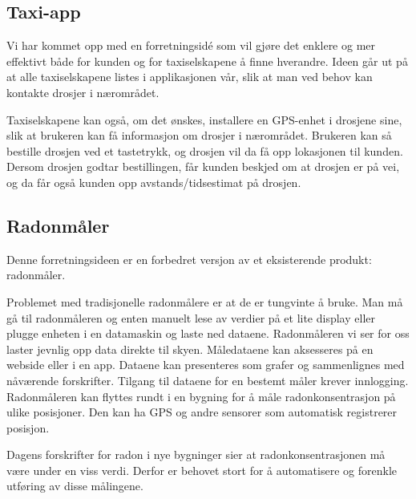 \subsection{Taxi-app}

Vi har kommet opp med en forretningsidé som vil gjøre det enklere og mer effektivt både for kunden og for taxiselskapene å finne hverandre. Ideen går ut på at alle taxiselskapene listes i applikasjonen vår, slik at man ved behov kan kontakte drosjer i nærområdet.

Taxiselskapene kan også, om det ønskes, installere en GPS-enhet i drosjene sine, slik at brukeren kan få informasjon om drosjer i nærområdet. Brukeren kan så bestille drosjen ved et tastetrykk, og drosjen vil da få opp lokasjonen til kunden. Dersom drosjen godtar bestillingen, får kunden beskjed om at drosjen er på vei, og da får også kunden opp avstands/tidsestimat på drosjen.

\subsection{Radonmåler}

Denne forretningsideen er en forbedret versjon av et eksisterende produkt: radonmåler.

Problemet med tradisjonelle radonmålere er at de er tungvinte å bruke. Man må gå til radonmåleren og enten manuelt lese av verdier på et lite display eller plugge enheten i en datamaskin og laste ned dataene. Radonmåleren vi ser for oss laster jevnlig opp data direkte til skyen. Måledataene kan aksesseres på en webside eller i en app. Dataene kan presenteres som grafer og sammenlignes med nåværende forskrifter. Tilgang til dataene for en bestemt måler krever innlogging. Radonmåleren kan flyttes rundt i en bygning for å måle radonkonsentrasjon på ulike posisjoner. Den kan ha GPS og andre sensorer som automatisk registrerer posisjon.

Dagens forskrifter for radon i nye bygninger sier at radonkonsentrasjonen må være under en viss verdi. Derfor er behovet stort for å automatisere og forenkle utføring av disse målingene.
